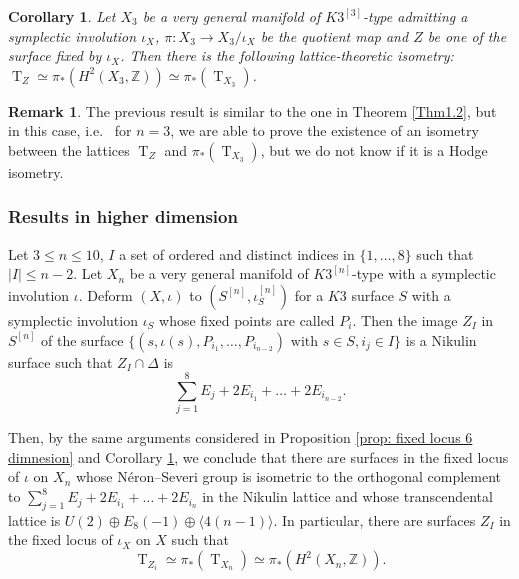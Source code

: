 \documentclass{amsart}
\newtheorem{cor}[thm]{Corollary}
\theoremstyle{definition}
\newtheorem{rem}[thm]{Remark}
\numberwithin{equation}{section}
\numberwithin{equation}{section} \theoremstyle{definition}
\DeclareMathOperator{\T}{T}
\newcommand{\ra}{\rightarrow}
\newcommand\Z{\mathbb{Z}}
\begin{document}
\begin{cor}\label{cor: conjecture dimension 6}
 Let $X_3$ be a very general  manifold of $K3^{[3]}$-type admitting a symplectic involution $\iota_X$, $\pi:X_3\ra X_3/\iota_X$ be the quotient map and $Z$ be one of the surface fixed by $\iota_X$. Then there is the following lattice-theoretic isometry: $\T_Z\simeq \pi_*(H^2(X_3,\Z))\simeq \pi_*(\T_{X_3})$.\end{cor}
\begin{rem}
The previous result is similar to the one in Theorem \ref{Thm1.2}, but in this case, i.e.~ for $n=3$, we are able to prove the existence of an isometry between the lattices $\T_Z$ and  $\pi_*(\T_{X_3})$, but we do not know if it is a Hodge isometry.
\end{rem}


\subsubsection{Results in higher dimension}

Let $3\leq n\leq 10$, $I$ a set of ordered and distinct indices in $\{1,\ldots,8\}$ such that $|I|\leq n-2$.
Let $X_n$ be a very general  manifold of $K3^{[n]}$-type with a symplectic involution $\iota$. Deform $(X,\iota)$ to $(S^{[n]},\iota_S^{[n]})$ for a $K3$ surface $S$ with a symplectic involution $\iota_S$ whose fixed points are called $P_i$. Then the image $Z_I$ in $S^{[n]}$ of the surface $\{(s,\iota(s), P_{i_1},\ldots,P_{i_{n-2}})\mbox{ with }s\in S, i_j\in I\}$ is a Nikulin surface such that $Z_I\cap \Delta$ is $$\sum_{j=1}^8 E_j+2E_{i_1}+\ldots +2E_{i_{n-2}}.$$ 

Then, by the same arguments considered in Proposition \ref{prop: fixed locus 6 dimnesion} and Corollary \ref{cor: conjecture dimension 6}, we conclude that there are surfaces in the fixed locus of $\iota$ on $X_n$ whose N\'eron--Severi group is isometric to the orthogonal complement to $\sum_{j=1}^8 E_j+2E_{i_1}+\ldots +2E_{i_n}$ in the Nikulin lattice and whose transcendental lattice is $U(2)\oplus E_8(-1)\oplus \langle 4(n-1)\rangle$. In particular, there are surfaces $Z_I$ in the fixed locus of $\iota_X$ on $X$ such that $$\T_{Z_i}\simeq \pi_*(\T_{X_n})\simeq \pi_*(H^2(X_n,\Z)).$$
\end{document}
